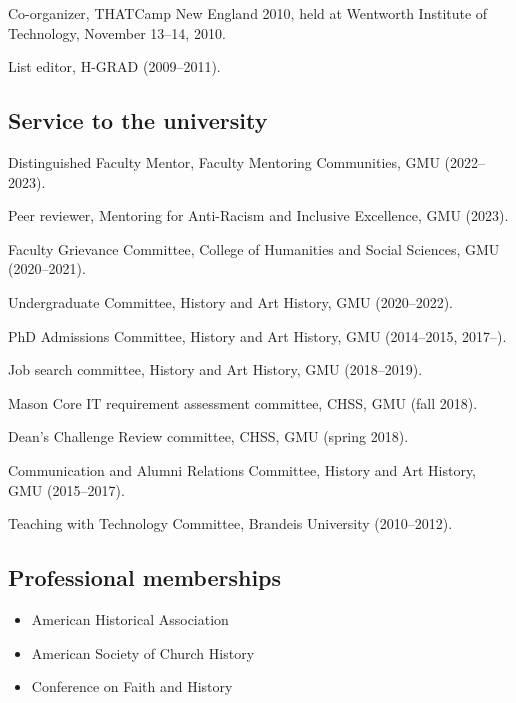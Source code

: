 \documentclass[11pt]{article}
\providecommand{\tightlist}{%
  \setlength{\itemsep}{0pt}\setlength{\parskip}{0pt}}
\begin{document}
Co-organizer, THATCamp New England 2010, held at Wentworth Institute of Technology, November 13--14, 2010.

List editor, H-GRAD (2009--2011).

\subsection{Service to the university}\label{Service to the university}

Distinguished Faculty Mentor, Faculty Mentoring Communities, GMU (2022--2023).

Peer reviewer, Mentoring for Anti-Racism and Inclusive Excellence, GMU (2023).

Faculty Grievance Committee, College of Humanities and Social Sciences, GMU (2020--2021).

Undergraduate Committee, History and Art History, GMU (2020--2022).

PhD Admissions Committee, History and Art History, GMU (2014--2015, 2017--).

Job search committee, History and Art History, GMU (2018--2019).

Mason Core IT requirement assessment committee, CHSS, GMU (fall 2018).

Dean's Challenge Review committee, CHSS, GMU (spring 2018).

Communication and Alumni Relations Committee, History and Art History, GMU 
(2015--2017).

Teaching with Technology Committee, Brandeis University (2010--2012).





\subsection{Professional memberships}\label{Memberships}

\begin{itemize}
    \tightlist
    \item American Historical Association
    \item American Society of Church History
    \item Conference on Faith and History
\end{itemize}
\end{document}
